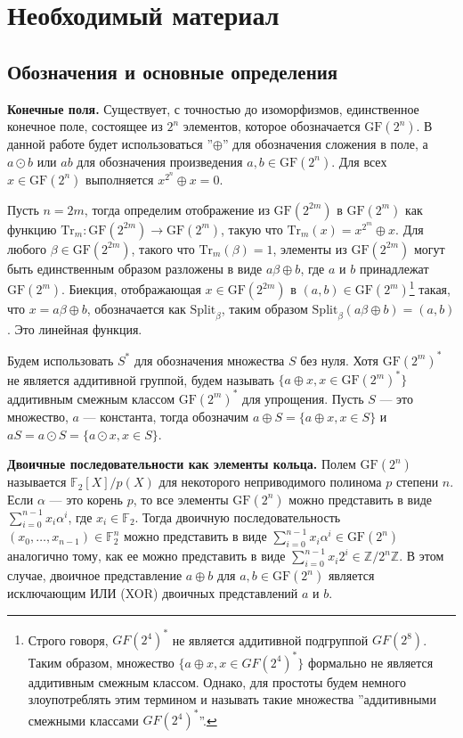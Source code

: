 \section{Необходимый материал}
\subsection{Обозначения и основные определения}
\textbf{Конечные поля.} Существует, с точностью до изоморфизмов, единственное конечное поле, состоящее из \(2^n\) элементов, которое обозначается \(\text{GF}(2^n)\). В данной работе будет использоваться ''\(\oplus\)'' для обозначения сложения в поле, а \(a \odot b\) или \(ab\) для обозначения произведения \(a, b \in \text{GF}(2^n)\). Для всех \(x \in \text{GF}(2^n)\) выполняется \(x^{2^n} \oplus x = 0\).

Пусть \(n = 2m\), тогда определим отображение из \(\text{GF}(2^{2m})\) в \(\text{GF}(2^m)\) как функцию \(\text{Tr}_m: \text{GF}(2^{2m}) \rightarrow \text{GF}(2^m)\), такую что \(\text{Tr}_m(x) = x^{2^m} \oplus x\). Для любого \(\beta \in \text{GF}(2^{2m})\), такого что \(\text{Tr}_m(\beta) = 1\), элементы из \(\text{GF}(2^{2m})\) могут быть единственным образом разложены в виде \(a\beta \oplus b\), где \(a\) и \(b\) принадлежат \(\text{GF}(2^m)\). Биекция, отображающая \(x \in \text{GF}(2^{2m})\) в \((a, b) \in \text{GF}(2^m)\)\footnote{Строго говоря, \(GF(2^4)^*\) не является аддитивной подгруппой \(GF(2^8)\). Таким образом, множество \(\{a \oplus x, x \in GF(2^4)^*\}\) формально не является аддитивным смежным классом. Однако, для простоты будем немного злоупотреблять этим термином и называть такие множества ''аддитивными смежными классами \(GF(2^4)^*\)''.} такая, что \(x = a\beta \oplus b\), обозначается как \(\text{Split}_\beta\), таким образом \(\text{Split}_\beta(a\beta \oplus b) = (a, b)\). Это линейная функция.

Будем использовать \(S^*\) для обозначения множества \(S\) без нуля. Хотя \(\text{GF}(2^m)^*\) не является аддитивной группой, будем называть \(\{a \oplus x, x \in \text{GF}(2^m)^*\}\) аддитивным смежным классом \(\text{GF}(2^m)^*\) для упрощения. Пусть \(S\) — это множество, \(a\) — константа, тогда обозначим \(a \oplus S = \{a \oplus x, x \in S\}\) и \(aS = a \odot S = \{a \odot x, x \in S\}\).

\textbf{Двоичные последовательности как элементы кольца.} Полем \(\text{GF}(2^n)\) называется \(\mathbb{F}_2[X]/p(X)\) для некоторого неприводимого полинома \(p\) степени \(n\). Если \(\alpha\) — это корень \(p\), то все элементы \(\text{GF}(2^n)\) можно представить в виде \(\sum_{i=0}^{n-1} x_i \alpha^i\), где \(x_i \in \mathbb{F}_2\). Тогда двоичную последовательность \((x_0, \ldots, x_{n-1}) \in \mathbb{F}_2^n\) можно представить в виде \(\sum_{i=0}^{n-1} x_i \alpha^i \in \text{GF}(2^n)\) аналогично тому, как ее можно представить в виде \(\sum_{i=0}^{n-1} x_i 2^i \in \mathbb{Z}/2^n\mathbb{Z}\). В этом случае, двоичное представление \(a \oplus b\) для \(a, b \in \text{GF}(2^n)\) является исключающим ИЛИ (XOR) двоичных представлений \(a\) и \(b\).

